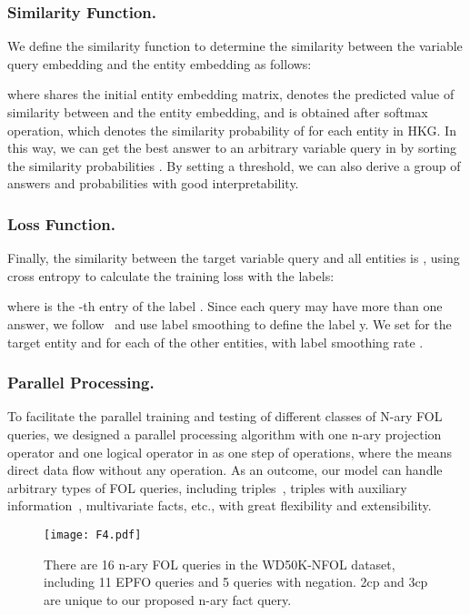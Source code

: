 \documentclass[letterpaper]{article} \usepackage{aaai23}  \usepackage{times}  \usepackage{helvet}  \usepackage{courier}  \usepackage[hyphens]{url}  \usepackage{graphicx} \urlstyle{rm} \def\UrlFont{\rm}  \usepackage{natbib}  \usepackage{caption} \frenchspacing  \setlength{\pdfpagewidth}{8.5in}  \setlength{\pdfpageheight}{11in}  \usepackage{algorithm}
\begin{document}
\subsubsection{Similarity Function.}
We define the similarity function  to determine the similarity between the variable query embedding and the entity embedding as follows:

where  shares the initial entity embedding matrix,  denotes the predicted value of similarity between  and the entity embedding, and  is obtained after softmax operation, which denotes the similarity probability of  for each entity in HKG. In this way, we can get the best answer to an arbitrary variable query  in  by sorting the similarity probabilities . By setting a threshold, we can also derive a group of answers and probabilities with good interpretability.

\subsubsection{Loss Function.}
Finally, the similarity between the target variable query and all entities is , using cross entropy to calculate the training loss with the labels:

where  is the -th entry of the label . Since each query may have more than one answer, we follow~\citep{GRAN} and use label smoothing to define the label y. We set  for the target entity and  for each of the other entities, with label smoothing rate .


\subsubsection{Parallel Processing.}
To facilitate the parallel training and testing of different classes of N-ary FOL queries, we designed a parallel processing algorithm with one n-ary projection operator  and one logical operator in  as one step of operations, where the  means direct data flow without any operation. As an outcome, our model can handle arbitrary types of FOL queries, including triples~\citep{BetaE}, triples with auxiliary information~\citep{StarQE}, multivariate facts, etc., with great flexibility and extensibility.




\begin{figure*}[t]
\centering
\texttt{[image: F4.pdf]}
\caption{There are 16 n-ary FOL queries in the WD50K-NFOL dataset, including 11 EPFO queries and 5 queries with negation. 2cp and 3cp are unique to our proposed n-ary fact query.}
\label{f4}
\end{figure*}
\end{document}
